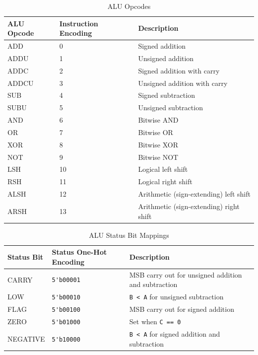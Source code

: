 \documentclass[conference]{IEEEtran}
\begin{document}
\begin{table} \centering
    \caption{ALU Opcodes}
    \label{table_alu_opcodes}
    \begin{tabular}{ | P{5em} | P{5em} | P{12em} | }
        \hline
        \textbf{ALU Opcode} & \textbf{Instruction Encoding} & \textbf{Description} \\
        \hline
        ADD & 0 & Signed addition \\
        \hline
        ADDU & 1 & Unsigned addition \\
        \hline
        ADDC & 2 & Signed addition with carry \\
        \hline
        ADDCU & 3 & Unsigned addition with carry \\
        \hline
        SUB & 4 & Signed subtraction \\
        \hline
        SUBU & 5 & Unsigned subtraction \\
        \hline
        AND & 6 & Bitwise AND \\
        \hline
        OR & 7 & Bitwise OR \\
        \hline
        XOR & 8 & Bitwise XOR \\
        \hline
        NOT & 9 & Bitwise NOT \\
        \hline
        LSH & 10 & Logical left shift \\
        \hline
        RSH & 11 & Logical right shift \\
        \hline
        ALSH & 12 & Arithmetic (sign-extending) left shift \\
        \hline
        ARSH & 13 & Arithmetic (sign-extending) right shift \\
        \hline
    \end{tabular}
\end{table}

\begin{table} \centering
    \caption{ALU Status Bit Mappings}
    \label{table_alu_status_bit_mappings}
    \begin{tabular}{ | P{5em} | P{5em} | P{12em} | }
        \hline
        \textbf{Status Bit} & \textbf{Status One-Hot Encoding} & \textbf{Description} \\
        \hline
        CARRY & \verb|5'b00001| & MSB carry out for unsigned addition and subtraction \\
        \hline
        LOW & \verb|5'b00010| & \verb|B < A| for unsigned subtraction \\
        \hline
        FLAG & \verb|5'b00100| & MSB carry out for signed addition \\
        \hline
        ZERO & \verb|5'b01000| & Set when \verb|C == 0| \\
        \hline
        NEGATIVE & \verb|5'b10000| & \verb|B < A| for signed addition and subtraction \\
        \hline
    \end{tabular}
\end{table}
\end{document}

